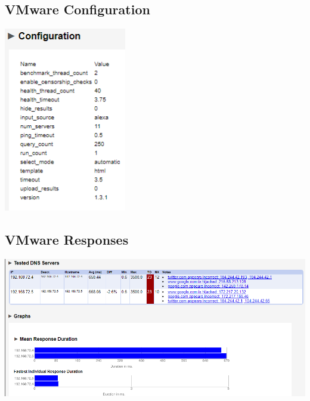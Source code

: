 \documentclass[12pt,twoside]{book}
\begin{document}
\subsection{VMware Configuration}
\includegraphics[width=0.40\textwidth]{Appendicies/VMwareTest3Config.PNG}
\subsection{VMware Responses}
\includegraphics[width=\textwidth]{Appendicies/VMwareTest3Result.PNG}
\end{document}
